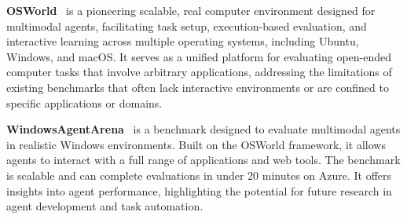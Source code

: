 \documentclass{article}
\newcommand{\citep}[1]{\parencite{#1}}
\begin{document}
\textbf{OSWorld}~\citep{xie2024osworld} is a pioneering scalable, real computer environment designed for multimodal agents, facilitating task setup, execution-based evaluation, and interactive learning across multiple operating systems, including Ubuntu, Windows, and macOS. It serves as a unified platform for evaluating open-ended computer tasks that involve arbitrary applications, addressing the limitations of existing benchmarks that often lack interactive environments or are confined to specific applications or domains.

\textbf{WindowsAgentArena}~\citep{bonatti2024windowsagentarenaevaluating} is a benchmark designed to evaluate multimodal agents in realistic Windows environments. Built on the OSWorld framework, it allows agents to interact with a full range of applications and web tools. The benchmark is scalable and can complete evaluations in under 20 minutes on Azure. It offers insights into agent performance, highlighting the potential for future research in agent development and task automation.
\end{document}
